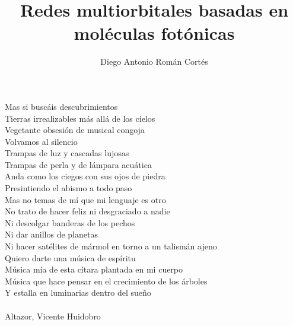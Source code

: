 \documentclass[hyphens]{umemoria}
\author{Diego Antonio Román Cortés}
\title{Redes multiorbitales basadas en moléculas fotónicas}
\begin{document}
\frontmatter
\maketitle

\begin{resumen}

\end{resumen}


\begin{dedicatoria}


Mas si buscáis descubrimientos\\
Tierras irrealizables más allá de los cielos\\
Vegetante obsesión de musical congoja\\
Volvamos al silencio\\

Trampas de luz y cascadas lujosas\\
Trampas de perla y de lámpara acuática\\
Anda como los ciegos con sus ojos de piedra\\
Presintiendo el abismo a todo paso\\
Mas no temas de mí que mi lenguaje es otro\\
No trato de hacer feliz ni desgraciado a nadie\\
Ni descolgar banderas de los pechos\\
Ni dar anillos de planetas\\
Ni hacer satélites de mármol en torno a un talismán ajeno\\
Quiero darte una música de espíritu\\
Música mía de esta cítara plantada en mi cuerpo\\
Música que hace pensar en el crecimiento de los árboles\\
Y estalla en luminarias dentro del sueño\\
\textnormal{\\Altazor, Vicente Huidobro}
\end{dedicatoria}

\begin{thanks}

\end{thanks}
\end{document}
